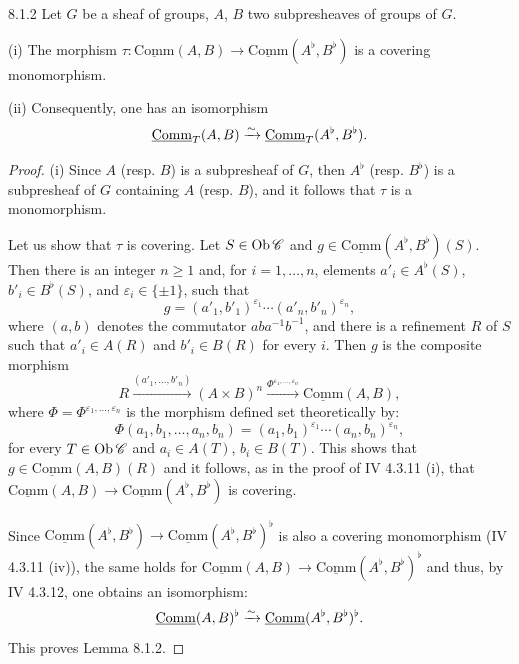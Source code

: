 \begin{lemma}{8.1.2}\label{VIB.8.1.2}
Let $G$ be a sheaf of groups, $A$, $B$ two subpresheaves of groups of $G$.

(i) The morphism $\tau:\underline{\mathrm{Comm}}(A,B)\to\underline{\mathrm{Comm}}(A^\flat,B^\flat)$ is a covering monomorphism.

(ii) Consequently, one has an isomorphism
\[
\underline{\mathrm{Comm}}_T(A,B)\xrightarrow{\sim}\underline{\mathrm{Comm}}_T(A^\flat,B^\flat).
\]
\end{lemma}
\begin{proof}
(i) Since $A$ (resp. $B$) is a subpresheaf of $G$, then $A^\flat$ (resp. $B^\flat$) is a subpresheaf of $G$ containing $A$ (resp. $B$), and it follows that $\tau$ is a monomorphism.

Let us show that $\tau$ is covering. Let $S\in\operatorname{Ob}\mathscr C$ and $g\in\underline{\mathrm{Comm}}(A^\flat,B^\flat)(S)$. Then there is an integer $n\geq1$ and, for $i=1,\ldots,n$, elements $a'_i\in A^\flat(S)$, $b'_i\in B^\flat(S)$, and $\varepsilon_i\in\{\pm1\}$, such that
\[
g=(a'_1,b'_1)^{\varepsilon_1}\cdots(a'_n,b'_n)^{\varepsilon_n},
\]
where $(a,b)$ denotes the commutator $aba^{-1}b^{-1}$, and there is a refinement $R$ of $S$ such that $a'_i\in A(R)$ and $b'_i\in B(R)$ for every $i$. Then $g$ is the composite morphism
\[
R\xrightarrow{(a'_1,\ldots,b'_n)}(A\times B)^n\xrightarrow{\Phi^{\varepsilon_1,\ldots,\varepsilon_n}}\underline{\mathrm{Comm}}(A,B),
\]
where $\Phi=\Phi^{\varepsilon_1,\ldots,\varepsilon_n}$ is the morphism defined set theoretically by:
\[
\Phi(a_1,b_1,\ldots,a_n,b_n)=(a_1,b_1)^{\varepsilon_1}\cdots(a_n,b_n)^{\varepsilon_n},
\]
for every $T\in\operatorname{Ob}\mathscr C$ and $a_i\in A(T)$, $b_i\in B(T)$. This shows that $g\in\underline{\mathrm{Comm}}(A,B)(R)$ and it follows, as in the proof of IV 4.3.11 (i), that $\underline{\mathrm{Comm}}(A,B)\to\underline{\mathrm{Comm}}(A^\flat,B^\flat)$ is covering.

Since $\underline{\mathrm{Comm}}(A^\flat,B^\flat)\to\underline{\mathrm{Comm}}(A^\flat,B^\flat)^\flat$ is also a covering monomorphism (IV 4.3.11 (iv)), the same holds for $\underline{\mathrm{Comm}}(A,B)\to\underline{\mathrm{Comm}}(A^\flat,B^\flat)^\flat$ and thus, by IV 4.3.12, one obtains an isomorphism:
\[
\underline{\mathrm{Comm}}(A,B)^\flat\xrightarrow{\sim}\underline{\mathrm{Comm}}(A^\flat,B^\flat)^\flat.
\]
This proves Lemma 8.1.2.
\end{proof}

